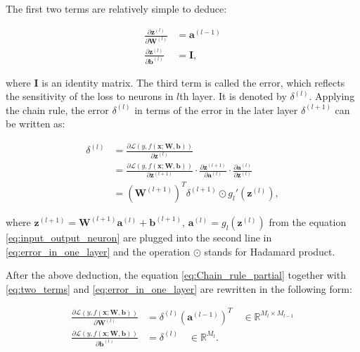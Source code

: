 \documentclass[
	parskip, 			   %
	twoside, 			   %
	DIV=14, 			   %
	BCOR=15.0mm, 		   %
	headsepline, 		   %
	open=right, 		   %
	captions=tableheading, %
	bibliography=totoc,    %
	numbers=noenddot       %
]{scrreprt}
\begin{document}
The first two terms are relatively simple to deduce:

\begin{equation}
    \label{eq:two_terms}
    \begin{aligned}
        \frac{\partial \mathbf{z}^{(l)}}{\partial \mathbf{W}^{(l)}} &= \mathbf{a}^{(l-1)}
        \\
        \frac{\partial \mathbf{z}^{(l)}}{\partial \mathbf{b}^{(l)}} &= \mathbf{I},
    \end{aligned}
\end{equation}

where $\mathbf{I}$ is an identity matrix. The third term is called the error, which reflects the sensitivity of the loss to neurons in $l$th layer. It is denoted by $\delta^{(l)}$. Applying the chain rule, the error $\delta^{(l)}$ in terms of the error in the
later layer $\delta^{(l+1)}$ can be written as:

\begin{equation}
    \label{eq:error_in_one_layer}
    \begin{aligned}
        \delta^{(l)} &= \frac{\partial \mathcal{L}\left( y,f(\mathbf{x};\mathbf{\mathbf{W},\mathbf{b}}) \right)}{\partial \mathbf{z}^{(l)}}
        \\
        &= \frac{\partial \mathcal{L}\left( y,f(\mathbf{x};\mathbf{\mathbf{W},\mathbf{b}}) \right)}{\partial \mathbf{z}^{(l+1)}} \cdot \frac{\partial \mathbf{z}^{(l+1)}}{\partial \mathbf{a}^{(l)}} \cdot \frac{\partial \mathbf{a}^{(l)}}{\partial \mathbf{z}^{(l)}}
        \\
        &= (\mathbf{W}^{(l+1)})^T \delta^{(l+1)} \odot g_{l}'(\mathbf{z}^{(l)}),
    \end{aligned}
\end{equation}

where $\mathbf{z}^{(l+1)} = \mathbf{W}^{(l+1)} \mathbf{a}^{(l)} + \mathbf{b}^{(l+1)}$, $\mathbf{a}^{(l)} = g_{l}(\mathbf{z}^{(l)})$ from the equation \ref{eq:input_output_neuron} are plugged into the second line in \ref{eq:error_in_one_layer} and the operation $\odot$ stands for Hadamard product.

After the above deduction, the equation \ref{eq:Chain_rule_partial} together with \ref{eq:two_terms} and \ref{eq:error_in_one_layer} are rewritten in the following form:

\begin{equation}
    \label{eq:Chain_rule_partial_deducted}
    \begin{aligned}
        \frac{\partial \mathcal{L}\left( y,f(\mathbf{x};\mathbf{\mathbf{W},\mathbf{b}}) \right)}{\partial \mathbf{W}^{(l)}} &= \delta^{(l)} (\mathbf{a}^{(l-1)})^T \quad \in \mathbb{R}^{M_{l} \times M_{l-1}}
        \\
        \frac{\partial \mathcal{L}\left( y,f(\mathbf{x};\mathbf{\mathbf{W},\mathbf{b}}) \right)}{\partial \mathbf{b}^{(l)}} &= \delta^{(l)} \quad \in \mathbb{R}^{M_{l}}.
    \end{aligned}
\end{equation}
\end{document}
